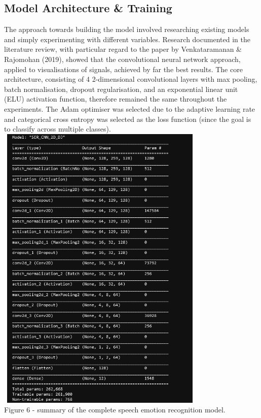 \documentclass[12pt]{article}
\begin{document}
\subsection{Model Architecture \& Training}
The approach towards building the model involved researching existing models and simply experimenting with different variables. Research documented in the literature review, with particular regard to the paper by Venkataramanan \& Rajomohan (2019), showed that the convolutional neural network approach, applied to visualisations of signals, achieved by far the best results. The core architecture, consisting of 4 2-dimensional convolutional layers with max pooling, batch normalisation, dropout regularisation, and an exponential linear unit (ELU) activation function, therefore remained the same throughout the experiments. The Adam optimiser was selected due to the adaptive learning rate and categorical cross entropy was selected as the loss function (since the goal is to classify across multiple classes).
\\

\includegraphics[width=10cm,height=14cm]{figure_6_model_visualisation}
\\

Figure 6 - summary of the complete speech emotion recognition model.
\\
\end{document}
